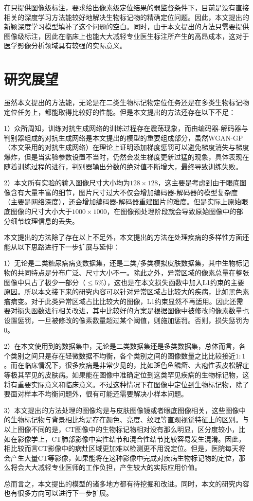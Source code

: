 在只提供图像级标注，要求给出像素级定位结果的弱监督条件下，目前是没有直接相关的深度学习方法能较好地解决生物标记物的精确定位问题。因此，本文提出的新颖深度学习模型填补了这个问题的空白。同时，由于本文提出的方法只需要提供图像级标注，因此在临床上也能大大减轻专业医生标注所产生的高昂成本，这对于医学影像分析领域具有较强的实际意义。

\section{研究展望}

虽然本文提出的方法能，无论是在二类生物标记物定位任务还是在多类生物标记物定位任务上，都能取得比较好的性能。但是本文提出的方法还存在以下不足：

1）众所周知，训练对抗生成网络的训练过程存在震荡现象，而由编码器-解码器与判别器组成的对抗生成网络是本文提出的模型的重要组成部分，虽然WGAN-GP（本文采用的对抗生成网络）在理论上证明添加梯度惩罚可以避免梯度消失与梯度爆炸，但是当实验参数设置不当时，仍然会发生梯度更新过猛的现象，具体表现在随着训练过程的进行，判别器输出分数的绝对值不断增大，最终导致训练失败。

2）本文所有实验的输入图像尺寸大小均为$128\times 128$，这主要是考虑到由于眼底图像含有大量丰富的细节，图片尺寸过大不仅会增加编码器-解码器的模型复杂度（主要是网络深度），还会增加编码器-解码器重建图片的难度。但是实际上原始眼底图像的尺寸大小大于$1000\times 1000$，在图像预处理阶段就会导致原始图像中的部分细节纹理信息的丢失。

本文提出的方法除了存在以上不足外，本文提出的方法在处理疾病的多样性方面还能从以下思路进行下一步扩展与延伸：

1）无论是二类糖尿病病变数据集，还是二类/多类模拟皮肤数据集，其中生物标记物的共同特点是分布广泛、尺寸大小不一。除此之外，异常区域的像素总量在整张图像中只占了极少一部分（$\le 5\%$），这也是在本文损失函数中加入L1约束的主要原因。所以本文接下来的研究内容可以针对异常区域占比较大的疾病，比如黑色素瘤病变。对于此类异常区域占比比较大的图像，L1约束显然不再适用。因此还需要对损失函数进行相关改进，其中比较好的方案是根据图像中被修改的像素数量也设置惩罚，一旦被修改的像素数量超过某个阈值，则施加惩罚。否则，损失惩罚为$0$。

2）在本文使用到的数据集中，无论是二类数据集还是多类数据集，总体而言，各个类别之间只是存在轻微数据不均衡，各个类别之间的图像数量之比比较接近$1:1$。而在临床情况下，很多疾病是非常少见的，比如斑色鱼鳞癣、大疱性表皮松解症等极其罕见的皮肤病。如果能在图像中准确定位到这类罕见疾病的生物标记物，这将有重要实际意义和临床意义。不过这种情况下在图像中定位到生物标记物，除了要面对样本不均衡问题外，很有可能还需要解决小样本问题。

3）本文提出的方法处理的图像均是与皮肤图像镜或者眼底图像相关，这些图像中的生物标记物与背景相比均是存在颜色、亮度、纹理等直观视觉特征上的区别。与以上图像不同的是，CT图像中的生物标记物相对没有那么明显，区分度较小，比如在影像学上，CT肺部影像中实性结节和混合性结节比较容易发生混淆。因此，相比较而言CT影像中的病灶区域更加难以检测更不用说定位。但是，医院每天将会产生大量CT等影像，如果能将在这种影像中完成对疾病生物标记物的定位，那么将会大大减轻专业医师的工作负担，产生较大的实际应用价值。

总而言之，本文提出的模型的诸多地方都有待挖掘和改进。同时，本文的研究内容也有很多方向可以进行下一步扩展。

